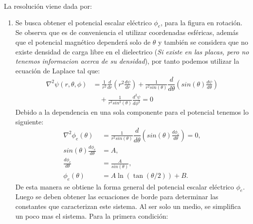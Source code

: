 \documentclass[
  11pt,
  letterpaper,
   addpoints,
   answers
  ]{exam}
\begin{document}
\begin{questions}
\begin{center}
\begin{tikzpicture}
        \end{tikzpicture}
    \end{center}
    \begin{solution}
         La resolución viene dada por:
    \begin{enumerate}
        \item Se busca obtener el potencial escalar eléctrico $\phi_{e}$, para la figura en rotación. Se observa que es de conveniencia el utilizar coordenadas esféricas, además que el potencial magnético dependerá solo de $\theta$ y también se considera que no existe densidad de carga libre en el dielectrico (\textit{Si existe en las placas, pero no tenemos informacion acerca de su densidad}), por tanto podemos utilizar la ecuación de Laplace tal que:
        \begin{equation}
            \begin{aligned}
                \nabla^{2}\psi (r,\theta,\phi) &= \frac{1}{r^{2}}\frac{d}{dr}\left(r^{2}\frac{d\psi}{dr}\right) + \frac{1}{r^{2}sin(\theta)}\dfrac{d}{d\theta}\left(sin(\theta) \frac{d\psi}{d\theta}\right) \\
                &\quad + \frac{1}{r^{2}sin^{2}(\theta) }\frac{d^{2}\psi}{d\phi^{2}} = 0
            \end{aligned}
        \end{equation}
        Debido a la dependencia en una sola componente para el potencial tenemos lo siguiente:
        \begin{equation}
            \begin{aligned}
                \nabla^{2}\phi_{e}(\theta) &=  \frac{1}{r^{2}sin(\theta)}\dfrac{d}{d\theta}\left(sin(\theta) \frac{d\phi_{e}}{d\theta}\right) = 0, \\
                sin(\theta) \frac{d\phi_{e}}{d\theta} &= A, \\
                \frac{d\phi_{e}}{d\theta} &= \frac{A}{sin(\theta)}, \\
                \phi_{e}(\theta) &= A\ln\left(\tan( \theta/2) \right) + B.
            \end{aligned}
        \end{equation}
        De esta manera se obtiene la forma general del potencial escalar eléctrico $\phi_{e}$. Luego se deben obtener las ecuaciones de borde para determinar las constantes que caracterizan este sistema. Al ser solo un medio, se simplifica un poco mas el sistema. Para la primera condición:
        \begin{equation}

\end{equation}
\end{enumerate}
\end{solution}
\end{questions}
\end{document}

